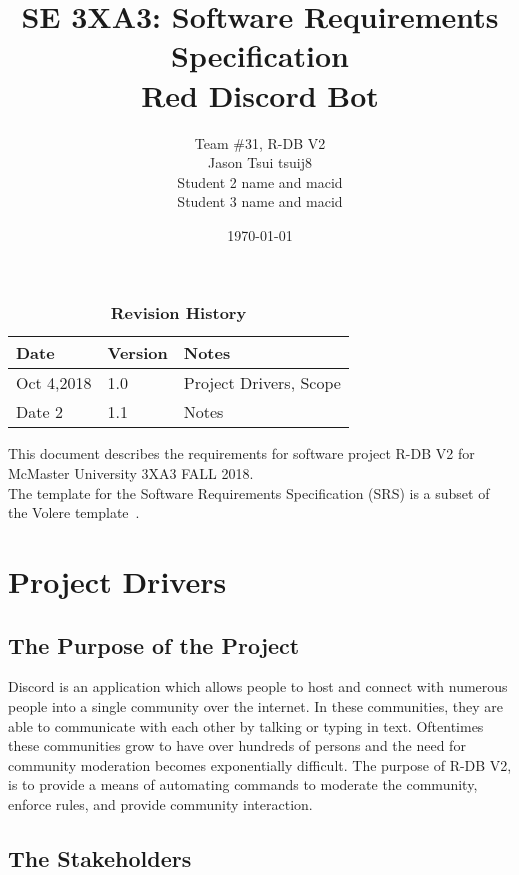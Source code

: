 \documentclass[12pt, titlepage]{article}
\title{SE 3XA3: Software Requirements Specification\\Red Discord Bot}
\author{Team \#31, R-DB V2
		\\ Jason Tsui tsuij8
		\\ Student 2 name and macid
		\\ Student 3 name and macid
}
\date{\today}
\begin{document}
\maketitle

\tableofcontents
\listoftables
\listoffigures

\begin{table}[bp]
\caption{\bf Revision History}
\begin{tabularx}{\textwidth}{p{3cm}p{2cm}X}
\toprule {\bf Date} & {\bf Version} & {\bf Notes}\\
\midrule
Oct 4,2018 & 1.0 & Project Drivers, Scope\\
Date 2 & 1.1 & Notes\\
\bottomrule
\end{tabularx}
\end{table}

\newpage


This document describes the requirements for software project R-DB V2 for McMaster University 3XA3 FALL 2018.\\

The template for the Software
Requirements Specification (SRS) is a subset of the Volere
template~\citep{RobertsonAndRobertson2012}.



\section{Project Drivers}

\subsection{The Purpose of the Project}
Discord is an application which allows people to host and connect with numerous people into a single community over the internet. In these communities, they are able to communicate with each other by talking or typing in text. Oftentimes these communities grow to have over hundreds of persons and the need for community moderation becomes exponentially difficult. The purpose of R-DB V2, is to provide a means of automating commands to moderate the community, enforce rules, and provide community interaction. 

\subsection{The Stakeholders}
\end{document}
